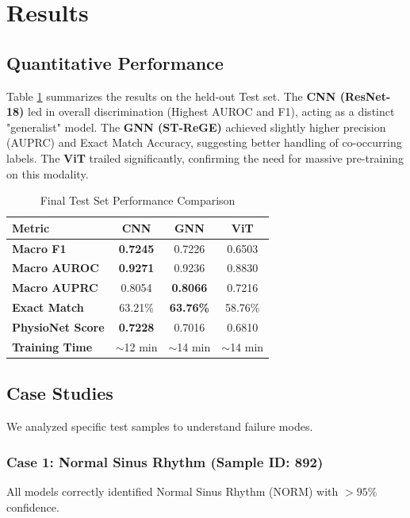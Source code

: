 \documentclass[conference]{IEEEtran}
\begin{document}
\section{Results}

\subsection{Quantitative Performance}
Table \ref{tab:results} summarizes the results on the held-out Test set. The \textbf{CNN (ResNet-18)} led in overall discrimination (Highest AUROC and F1), acting as a distinct "generalist" model. The \textbf{GNN (ST-ReGE)} achieved slightly higher precision (AUPRC) and Exact Match Accuracy, suggesting better handling of co-occurring labels. The \textbf{ViT} trailed significantly, confirming the need for massive pre-training on this modality.

\begin{table}[htbp]
\caption{Final Test Set Performance Comparison}
\begin{center}
\begin{tabular}{lccc}
\toprule
\textbf{Metric} & \textbf{CNN} & \textbf{GNN} & \textbf{ViT} \\
\midrule
\textbf{Macro F1} & \textbf{0.7245} & 0.7226 & 0.6503 \\
\textbf{Macro AUROC} & \textbf{0.9271} & 0.9236 & 0.8830 \\
\textbf{Macro AUPRC} & 0.8054 & \textbf{0.8066} & 0.7216 \\
\textbf{Exact Match} & 63.21\% & \textbf{63.76\%} & 58.76\% \\
\textbf{PhysioNet Score} & \textbf{0.7228} & 0.7016 & 0.6810 \\
\textbf{Training Time} & $\sim$12 min & $\sim$14 min & $\sim$14 min \\
\bottomrule
\end{tabular}
\label{tab:results}
\end{center}
\end{table}

\subsection{Case Studies}
We analyzed specific test samples to understand failure modes.
\subsubsection{Case 1: Normal Sinus Rhythm (Sample ID: 892)}
All models correctly identified Normal Sinus Rhythm (NORM) with $>95\%$ confidence.
\end{document}
